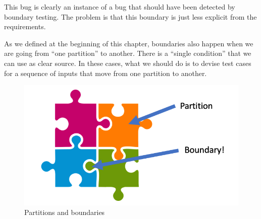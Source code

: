 \begin{Shaded}
\begin{Highlighting}[]
 
       \NormalTok{;}

      \NormalTok{(}
        \NormalTok{;}
\NormalTok{);}

\NormalTok{    \}}
\NormalTok{\}}
\end{Highlighting}
\end{Shaded}

This bug is clearly an instance of a bug that should have been detected
by boundary testing. The problem is that this boundary is just less
explicit from the requirements.

As we defined at the beginning of this chapter, boundaries also happen
when we are going from ``one partition'' to another. There is a ``single
condition'' that we can use as clear source. In these cases, what we
should do is to devise test cases for a sequence of inputs that move
from one partition to another.

\begin{figure}
\centering
\includegraphics{img/boundary-testing/partition-boundary.png}
\caption{Partitions and boundaries}
\end{figure}

